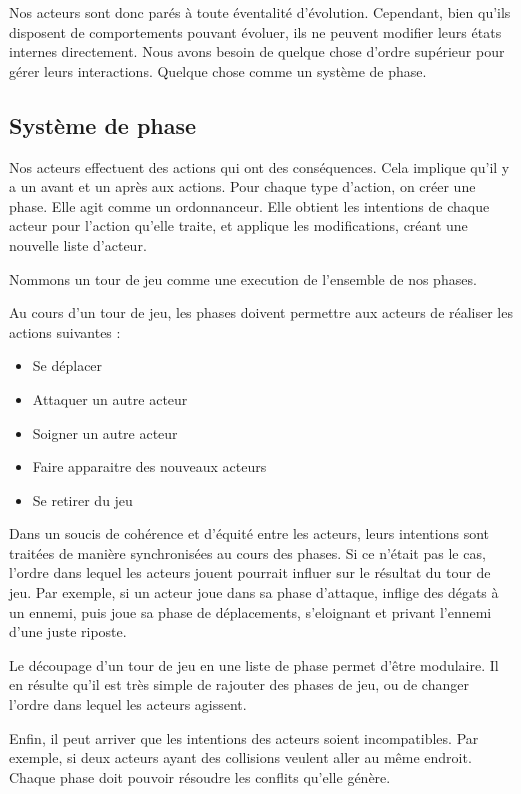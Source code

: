 \documentclass{article}
\begin{document}
Nos acteurs sont donc parés à toute éventalité d'évolution.
Cependant, bien qu'ils disposent de comportements pouvant évoluer, ils ne peuvent modifier leurs 
états internes directement.
Nous avons besoin de quelque chose d'ordre supérieur pour gérer leurs interactions.
Quelque chose comme un système de phase.

\subsection{Système de phase}

Nos acteurs effectuent des actions qui ont des conséquences.
Cela implique qu'il y a un avant et un après aux actions.
Pour chaque type d'action, on créer une phase.
Elle agit comme un ordonnanceur. Elle obtient les intentions de chaque 
acteur pour l'action qu'elle traite, et applique les modifications, 
créant une nouvelle liste d'acteur.

Nommons un tour de jeu comme une execution de l'ensemble de nos phases.

Au cours d'un tour de jeu, les phases doivent permettre aux acteurs de réaliser les actions suivantes :
\begin{itemize}
  \item Se déplacer
  \item Attaquer un autre acteur
  \item Soigner un autre acteur
  \item Faire apparaitre des nouveaux acteurs
  \item Se retirer du jeu
\end{itemize}  

Dans un soucis de cohérence et d'équité entre les acteurs, 
leurs intentions sont traitées de manière synchronisées au cours des phases.
Si ce n'était pas le cas, l'ordre dans lequel les acteurs jouent pourrait influer 
sur le résultat du tour de jeu. Par exemple, si un acteur joue dans sa 
phase d'attaque, inflige des dégats à un ennemi, puis joue sa phase de déplacements,
s'eloignant et privant l'ennemi d'une juste riposte.

Le découpage d'un tour de jeu en une liste de phase permet d'être modulaire.
Il en résulte qu'il est très simple de rajouter des phases de jeu, ou de 
changer l'ordre dans lequel les acteurs agissent.

Enfin, il peut arriver que les intentions des acteurs soient incompatibles.
Par exemple, si deux acteurs ayant des collisions veulent aller au même endroit.
Chaque phase doit pouvoir résoudre les conflits qu'elle génère.
\end{document}
